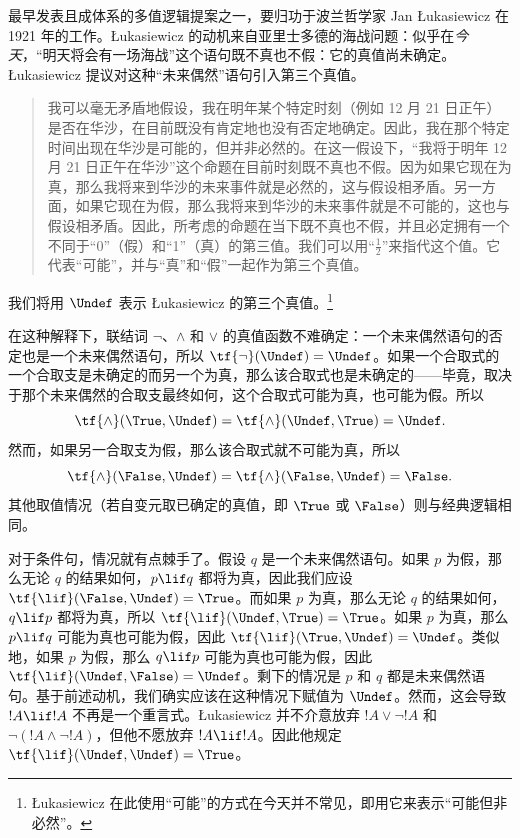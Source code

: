 \documentclass[../../../include/open-logic-section]{subfiles}
\begin{document}


最早发表且成体系的多值逻辑提案之一，要归功于波兰哲学家 Jan \L ukasiewicz 在 1921 年的工作。\L ukasiewicz 的动机来自亚里士多德的海战问题：似乎在\emph{今天}，“明天将会有一场海战”这个语句既不真也不假：它的真值尚未确定。\L ukasiewicz 提议对这种“未来偶然”语句引入第三个真值。

\begin{quote}
我可以毫无矛盾地假设，我在明年某个特定时刻（例如 12 月 21 日正午）是否在华沙，在目前既没有肯定地也没有否定地确定。因此，我在那个特定时间出现在华沙是可能的，但并非必然的。在这一假设下，“我将于明年 12 月 21 日正午在华沙”这个命题在目前时刻既不真也不假。因为如果它现在为真，那么我将来到华沙的未来事件就是必然的，这与假设相矛盾。另一方面，如果它现在为假，那么我将来到华沙的未来事件就是不可能的，这也与假设相矛盾。因此，所考虑的命题在当下既不真也不假，并且必定拥有一个不同于“0”（假）和“1”（真）的第三值。我们可以用“$\frac{1}{2}$”来指代这个值。它代表“可能”，并与“真”和“假”一起作为第三个真值。
\end{quote}

我们将用 $\Undef$ 表示 \L ukasiewicz 的第三个真值。\footnote{\L ukasiewicz 在此使用“可能”的方式在今天并不常见，即用它来表示“可能但非必然”。}

在这种解释下，联结词 $\lnot$、$\land$ 和 $\lor$ 的真值函数不难确定：一个未来偶然语句的否定也是一个未来偶然语句，所以 $\tf{\lnot}(\Undef) = \Undef$。如果一个合取式的一个合取支是未确定的而另一个为真，那么该合取式也是未确定的——毕竟，取决于那个未来偶然的合取支最终如何，这个合取式可能为真，也可能为假。所以 \[
    \tf{\land}(\True, \Undef) =
\tf{\land}(\Undef, \True) =
\Undef.
\]
然而，如果另一合取支为假，那么该合取式就不可能为真，所以 \[\tf{\land}(\False, \Undef) =
\tf{\land}(\False, \Undef) = \False.\]
其他取值情况（若自变元取已确定的真值，即 $\True$ 或 $\False$）则与经典逻辑相同。

对于条件句，情况就有点棘手了。假设 $q$ 是一个未来偶然语句。如果 $p$ 为假，那么无论 $q$ 的结果如何，$p \lif q$ 都将为真，因此我们应设 $\tf{\lif}(\False, \Undef) = \True$。而如果 $p$ 为真，那么无论 $q$ 的结果如何，$q \lif p$ 都将为真，所以 $\tf{\lif}(\Undef, \True) = \True$。如果 $p$ 为真，那么 $p \lif q$ 可能为真也可能为假，因此 $\tf{\lif}(\True,
\Undef) = \Undef$。类似地，如果 $p$ 为假，那么 $q \lif p$ 可能为真也可能为假，因此 $\tf{\lif}(\Undef, \False) = \Undef$。剩下的情况是 $p$ 和 $q$ 都是未来偶然语句。基于前述动机，我们确实应该在这种情况下赋值为 $\Undef$。然而，这会导致 $!A \lif !A$ 不再是一个重言式。\L ukasiewicz 并不介意放弃 $!A \lor \lnot !A$ 和 $\lnot(!A \land \lnot !A)$，但他不愿放弃 $!A \lif !A$。因此他规定 $\tf{\lif}(\Undef, \Undef) =
\True$。
\end{document}
